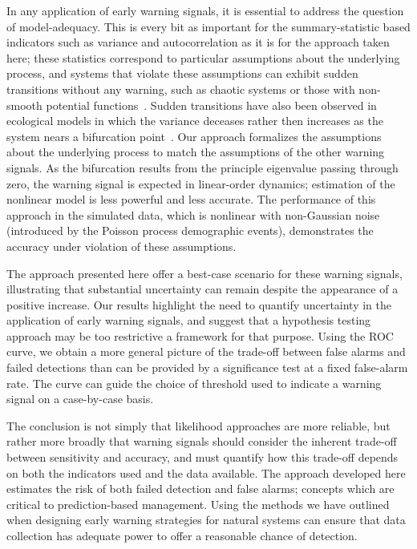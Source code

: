 \documentclass{pnastwo}
\begin{document}
\begin{article}
In any application of early warning signals, it is essential to address the question of model-adequacy.  
This is every bit as important for the summary-statistic based indicators such as variance and autocorrelation
as it is for the approach taken here; these statistics correspond to particular assumptions about the underlying process,
and systems that violate these assumptions can exhibit sudden transitions without any warning,
such as chaotic systems or those with non-smooth potential functions~\cite{Hastings2010}.
Sudden transitions have also been observed in ecological models in which 
the variance deceases rather then increases as the system nears a bifurcation point~\cite{Schreiber2003, Schreiber2008}.  
Our approach formalizes the assumptions about the underlying process to match the assumptions of the other warning signals.  
As the bifurcation results from the principle eigenvalue passing through zero, 
the warning signal is expected in linear-order dynamics;
estimation of the nonlinear model is less powerful and less accurate.  
The performance of this approach in the simulated data, which is nonlinear with non-Gaussian noise 
(introduced by the Poisson process demographic events), 
demonstrates the accuracy under violation of these assumptions.  


The approach presented here offer a best-case scenario for these warning signals,
illustrating that substantial uncertainty can remain despite the appearance of a positive increase.
Our results highlight the need to quantify uncertainty in the application of early warning signals,
and suggest that a hypothesis testing approach may be too restrictive a framework for that purpose.
Using the ROC curve, we obtain a more general picture of the trade-off between false alarms and failed detections
than can be provided by a significance test at a fixed false-alarm rate.  
The curve can guide the choice of threshold used to indicate a warning signal on a case-by-case basis.  


The conclusion is not simply that likelihood approaches are more reliable, 
but rather more broadly that warning signals should consider
the inherent trade-off between sensitivity and accuracy,
and must quantify how this trade-off depends on both the indicators used and the data available.  
The approach developed here estimates the risk of both failed detection and false alarms;
concepts which are critical to prediction-based management.  
Using the methods we have outlined when designing early warning strategies for natural systems
can ensure that data collection has adequate power to offer a reasonable chance of detection. 


\end{article}
\end{document}
